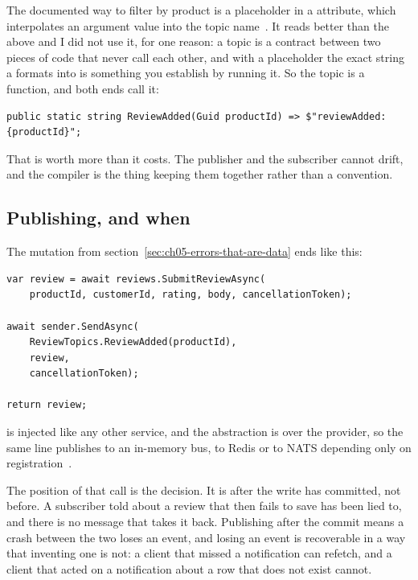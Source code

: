 %
The documented way to filter by product is a placeholder in a \code{[Topic]}
attribute, which interpolates an argument value into the topic
name~\autocite{chillicream2026subscriptions}. It reads better than the above and
I did not use it, for one reason: a topic is a contract between two pieces of
code that never call each other, and with a placeholder the exact string a
 formats into is something you establish by running it. So the topic
is a function, and both ends call it:

\begin{verbatim}
public static string ReviewAdded(Guid productId) => $"reviewAdded:{productId}";
\end{verbatim}

That is worth more than it costs. The publisher and the subscriber cannot drift,
and the compiler is the thing keeping them together rather than a convention.

\subsection*{Publishing, and when}

%
The mutation from section~\ref{sec:ch05-errors-that-are-data} ends like this:

\begin{verbatim}
var review = await reviews.SubmitReviewAsync(
    productId, customerId, rating, body, cancellationToken);

await sender.SendAsync(
    ReviewTopics.ReviewAdded(productId),
    review,
    cancellationToken);

return review;
\end{verbatim}

 is injected like any other service, and the abstraction
is over the provider, so the same line publishes to an in-memory bus, to Redis
or to NATS depending only on registration~\autocite{chillicream2026subscriptions}.

The position of that call is the decision. It is after the write has committed,
not before. A subscriber told about a review that then fails to save has been
lied to, and there is no message that takes it back. Publishing after the commit
means a crash between the two loses an event, and losing an event is recoverable
in a way that inventing one is not: a client that missed a notification can
refetch, and a client that acted on a notification about a row that does not
exist cannot.

